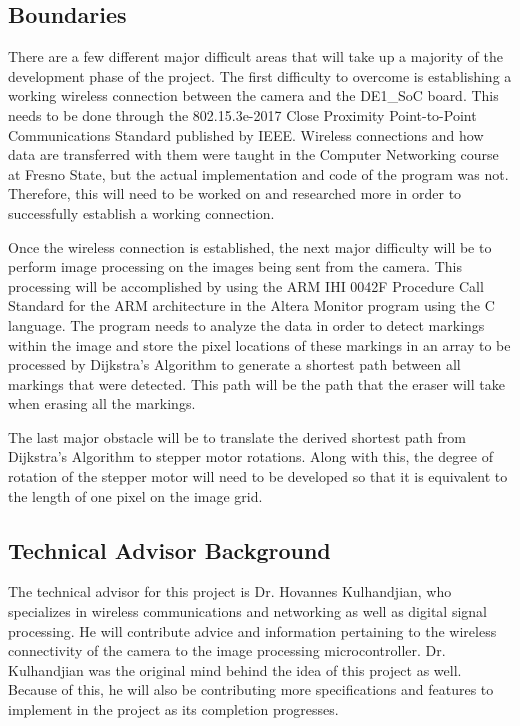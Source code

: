 \subsection{Boundaries}


\setlength{\parindent}{2.5ex} There are a few different major difficult areas that will take up a majority of the development phase of the project. The first difficulty to overcome is establishing a working wireless connection between the camera and the DE1\_SoC board. This needs to be done through the 802.15.3e-2017 Close Proximity Point-to-Point Communications Standard published by IEEE. Wireless connections and how data are transferred with them were taught in the Computer Networking course at Fresno State, but the actual implementation and code of the program was not. Therefore, this will need to be worked on and researched more in order to successfully establish a working connection.\par
\setlength{\parindent}{2.5ex}
Once the wireless connection is established, the next major difficulty will be to perform image processing on the images being sent from the camera. This processing will be accomplished by using the ARM IHI 0042F Procedure Call Standard for the ARM architecture in the Altera Monitor program using the C language. The program needs to analyze the data in order to detect markings within the image and store the pixel locations of these markings in an array to be processed by Dijkstra's Algorithm to generate a shortest path between all markings that were detected. This path will be the path that the eraser will take when erasing all the markings.\par
\setlength{\parindent}{2.5ex}
The last major obstacle will be to translate the derived shortest path from Dijkstra's Algorithm to stepper motor rotations. Along with this, the degree of rotation of the stepper motor will need to be developed so that it is equivalent to the length of one pixel on the image grid. \\

\subsection{Technical Advisor Background} \par	
\setlength{\parindent}{2.5ex} The technical advisor for this project is Dr. Hovannes Kulhandjian, who specializes in wireless communications and networking as well as digital signal processing. He will contribute advice and information pertaining to the wireless connectivity of the camera to the image processing microcontroller. Dr. Kulhandjian was the original mind behind the idea of this project as well. Because of this, he will also be contributing more specifications and features to implement in the project as its completion progresses. \\ \par

